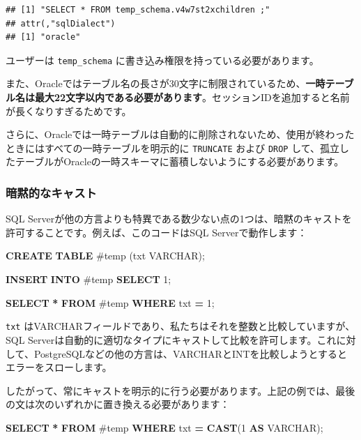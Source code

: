 \documentclass[
  11pt]{book}
\newenvironment{Shaded}{\begin{snugshade}}{\end{snugshade}}
\newcommand{\DataTypeTok}[1]{\textcolor[rgb]{0.13,0.29,0.53}{#1}}
\newcommand{\DecValTok}[1]{\textcolor[rgb]{0.00,0.00,0.81}{#1}}
\newcommand{\FunctionTok}[1]{\textcolor[rgb]{0.13,0.29,0.53}{\textbf{#1}}}
\newcommand{\KeywordTok}[1]{\textcolor[rgb]{0.13,0.29,0.53}{\textbf{#1}}}
\newcommand{\NormalTok}[1]{#1}
\newcommand{\OperatorTok}[1]{\textcolor[rgb]{0.81,0.36,0.00}{\textbf{#1}}}
\newcommand{\StringTok}[1]{\textcolor[rgb]{0.31,0.60,0.02}{#1}}
\theoremstyle{definition}
\theoremstyle{definition}
\theoremstyle{definition}
\theoremstyle{definition}
\theoremstyle{remark}
\begin{document}
\begin{verbatim}
## [1] "SELECT * FROM temp_schema.v4w7st2xchildren ;"
## attr(,"sqlDialect")
## [1] "oracle"
\end{verbatim}

ユーザーは \texttt{temp\_schema} に書き込み権限を持っている必要があります。

また、Oracleではテーブル名の長さが30文字に制限されているため、\textbf{一時テーブル名は最大22文字以内である必要があります}。セッションIDを追加すると名前が長くなりすぎるためです。

さらに、Oracleでは一時テーブルは自動的に削除されないため、使用が終わったときにはすべての一時テーブルを明示的に \texttt{TRUNCATE} および \texttt{DROP} して、孤立したテーブルがOracleの一時スキーマに蓄積しないようにする必要があります。

\subsubsection*{暗黙的なキャスト}\label{ux6697ux9ed9ux7684ux306aux30adux30e3ux30b9ux30c8}

SQL Serverが他の方言よりも特異である数少ない点の1つは、暗黙のキャストを許可することです。例えば、このコードはSQL Serverで動作します：

\begin{Shaded}
\begin{Highlighting}[]
\KeywordTok{CREATE} \KeywordTok{TABLE}\NormalTok{ \#temp (txt }\DataTypeTok{VARCHAR}\NormalTok{);}

\KeywordTok{INSERT} \KeywordTok{INTO}\NormalTok{ \#temp}
\KeywordTok{SELECT} \StringTok{\textquotesingle{}1\textquotesingle{}}\NormalTok{;}

\KeywordTok{SELECT} \OperatorTok{*} \KeywordTok{FROM}\NormalTok{ \#temp }\KeywordTok{WHERE}\NormalTok{ txt }\OperatorTok{=} \DecValTok{1}\NormalTok{;}
\end{Highlighting}
\end{Shaded}

\texttt{txt} はVARCHARフィールドであり、私たちはそれを整数と比較していますが、SQL Serverは自動的に適切なタイプにキャストして比較を許可します。これに対して、PostgreSQLなどの他の方言は、VARCHARとINTを比較しようとするとエラーをスローします。

したがって、常にキャストを明示的に行う必要があります。上記の例では、最後の文は次のいずれかに置き換える必要があります：

\begin{Shaded}
\begin{Highlighting}[]
\KeywordTok{SELECT} \OperatorTok{*} \KeywordTok{FROM}\NormalTok{ \#temp }\KeywordTok{WHERE}\NormalTok{ txt }\OperatorTok{=} \FunctionTok{CAST}\NormalTok{(}\DecValTok{1} \KeywordTok{AS} \DataTypeTok{VARCHAR}\NormalTok{);}
\end{Highlighting}
\end{Shaded}
\end{document}
